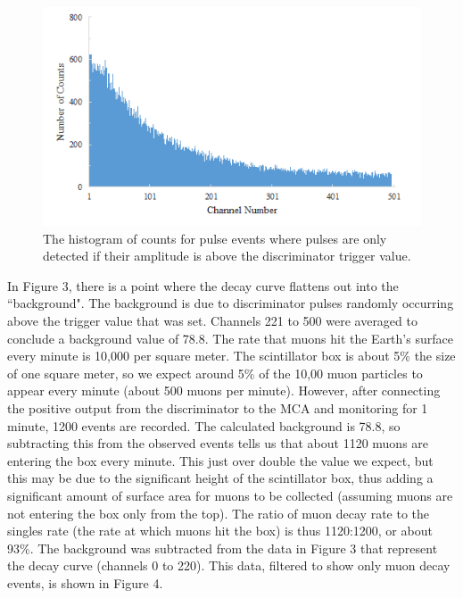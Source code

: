 \documentclass[%
 aip,
 amsmath,amssymb,
 reprint,%
floatfix,
]{revtex4-1}
\begin{document}
\begin{figure}[H]
	\centering
	\includegraphics[scale=0.8]{unfiltered.png}
	\caption{The histogram of counts for pulse events where pulses are only detected if their amplitude is above the discriminator trigger value.}
\end{figure}

In Figure 3, there is a point where the decay curve flattens out into the “background". The background is due to discriminator pulses randomly occurring above the trigger value that was set. Channels 221 to 500 were averaged to conclude a background value of 78.8. The rate that muons hit the Earth's surface every minute is 10,000 per square meter\cite{Wolverton2007}. The scintillator box is about 5\% the size of one square meter, so we expect around 5\% of the 10,00 muon particles to appear every minute (about 500 muons per minute). However, after connecting the positive output from the discriminator to the MCA and monitoring for 1 minute, 1200 events are recorded. The calculated background is 78.8, so subtracting this from the observed events tells us that about 1120 muons are entering the box every minute. This just over double the value we expect, but this may be due to the significant height of the scintillator box, thus adding a significant amount of surface area for muons to be collected (assuming muons are not entering the box only from the top). The ratio of muon decay rate to the singles rate (the rate at which muons hit the box) is thus 1120:1200, or about 93\%. The background was subtracted from the data in Figure 3 that represent the decay curve (channels 0 to 220). This data, filtered to show only muon decay events, is shown in Figure 4.
\end{document}
